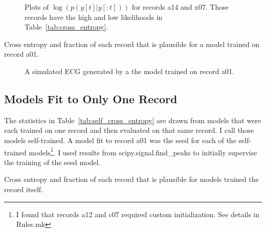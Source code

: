 \documentclass[12pt]{article}
\begin{document}
\begin{figure}
  \centering
  \caption{Plots of $\log\left(p(y[t]|y[:t]) \right)$ for records a14
    and x07.  Those records have the high and low likelihoods in
    Table~\ref{tab:cross_entropy}.}
  \label{fig:likelihood}
\end{figure}

\begin{table}
  \centering
    
  \caption[Cross Entropy]{Cross entropy and fraction of each record
    that is plausible for a model trained on record a01.}
  \label{tab:cross_entropy}
\end{table}

\begin{figure}
  \centering
  \caption{A simulated ECG generated by a the model trained on record a01.}
  \label{fig:simulated}
\end{figure}

\subsection{Models Fit to Only One Record}
\label{sec:selves}

The statistics in Table~\ref{tab:self_cross_entropy} are drawn from
models that were each trained on one record and then evaluated on that
same record.  I call those models self-trained.  A model fit to record
a01 was the seed for each of the self-trained models\footnote{I found
  that records a12 and c07 required custom initialization.  See
  details in Rules.mk}.  I used results from scipy.signal.find\_peaks to
initially supervise the training of the seed model.

\begin{table}
  \centering
    
  \caption[Cross Entropy]{Cross entropy and fraction of each record
    that is plausible for models trained the record itself.}
  \label{tab:self_cross_entropy}
\end{table}
\end{document}
